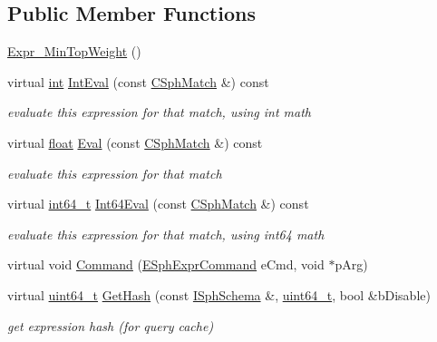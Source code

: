 \subsection*{Public Member Functions}
\begin{DoxyCompactItemize}
\item 
\hyperlink{structExpr__MinTopWeight_adb405b2787a22f5b4a15cd8bca9ca5f9}{Expr\-\_\-\-Min\-Top\-Weight} ()
\item 
virtual \hyperlink{sphinxexpr_8cpp_a4a26e8f9cb8b736e0c4cbf4d16de985e}{int} \hyperlink{structExpr__MinTopWeight_a8ae95518d20fafc944490ad42d92dfaa}{Int\-Eval} (const \hyperlink{classCSphMatch}{C\-Sph\-Match} \&) const 
\begin{DoxyCompactList}\small\item\em evaluate this expression for that match, using int math \end{DoxyCompactList}\item 
virtual \hyperlink{sphinxexpr_8cpp_a0e0d0739f7035f18f949c2db2c6759ec}{float} \hyperlink{structExpr__MinTopWeight_abebb616b3a4a7ec6ec0bdf933298e1d1}{Eval} (const \hyperlink{classCSphMatch}{C\-Sph\-Match} \&) const 
\begin{DoxyCompactList}\small\item\em evaluate this expression for that match \end{DoxyCompactList}\item 
virtual \hyperlink{sphinxstd_8h_a996e72f71b11a5bb8b3b7b6936b1516d}{int64\-\_\-t} \hyperlink{structExpr__MinTopWeight_a961a4288241c73277e9deda37a1e6830}{Int64\-Eval} (const \hyperlink{classCSphMatch}{C\-Sph\-Match} \&) const 
\begin{DoxyCompactList}\small\item\em evaluate this expression for that match, using int64 math \end{DoxyCompactList}\item 
virtual void \hyperlink{structExpr__MinTopWeight_a455c384cb3a13ef404749f656e7b2656}{Command} (\hyperlink{sphinxexpr_8h_a30be184fb07bd80c271360fc6094c818}{E\-Sph\-Expr\-Command} e\-Cmd, void $\ast$p\-Arg)
\item 
virtual \hyperlink{sphinxstd_8h_aaa5d1cd013383c889537491c3cfd9aad}{uint64\-\_\-t} \hyperlink{structExpr__MinTopWeight_aaf8b9a0821ab92594f65338b68a903b1}{Get\-Hash} (const \hyperlink{classISphSchema}{I\-Sph\-Schema} \&, \hyperlink{sphinxstd_8h_aaa5d1cd013383c889537491c3cfd9aad}{uint64\-\_\-t}, bool \&b\-Disable)
\begin{DoxyCompactList}\small\item\em get expression hash (for query cache) \end{DoxyCompactList}\end{DoxyCompactItemize}
